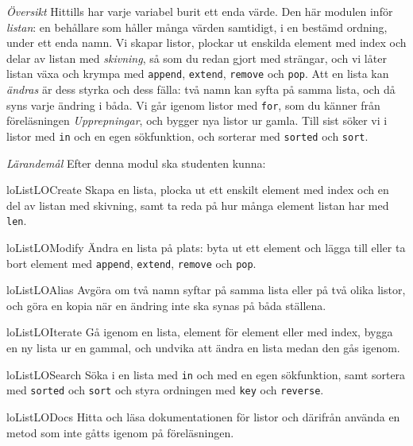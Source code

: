 \emph{Översikt}
Hittills har varje variabel burit ett enda värde.  Den här modulen inför
\emph{listan}: en behållare som håller många värden samtidigt, i en
bestämd ordning, under ett enda namn.  Vi skapar listor, plockar ut
enskilda element med index och delar av listan med \emph{skivning}, så
som du redan gjort med strängar, och vi låter listan växa och krympa
med \texttt{append}, \texttt{extend},
\texttt{remove} och \texttt{pop}.  Att en lista
kan \emph{ändras} är dess styrka och dess fälla: två namn kan syfta på
samma lista, och då syns varje ändring i båda.  Vi går igenom listor med
\texttt{for}, som du känner från föreläsningen
\emph{Upprepningar}, och
bygger nya listor ur gamla.  Till sist söker vi i listor med
\texttt{in} och en egen sökfunktion, och sorterar med
\texttt{sorted} och \texttt{sort}.

\emph{Lärandemål}
Efter denna modul ska studenten kunna:
\begin{restatable}{lo}{ListLOCreate}\label{ListLOCreate}%
  Skapa en lista, plocka ut ett enskilt element med index och en del av
  listan med skivning, samt ta reda på hur många element listan har med
  \texttt{len}.
\end{restatable}%
\begin{restatable}{lo}{ListLOModify}\label{ListLOModify}%
  Ändra en lista på plats: byta ut ett element och lägga till eller ta
  bort element med \texttt{append},
  \texttt{extend}, \texttt{remove} och
  \texttt{pop}.
\end{restatable}%
\begin{restatable}{lo}{ListLOAlias}\label{ListLOAlias}%
  Avgöra om två namn syftar på samma lista eller på två olika listor, och
  göra en kopia när en ändring inte ska synas på båda ställena.
\end{restatable}%
\begin{restatable}{lo}{ListLOIterate}\label{ListLOIterate}%
  Gå igenom en lista, element för element eller med index, bygga en ny
  lista ur en gammal, och undvika att ändra en lista medan den gås
  igenom.
\end{restatable}%
\begin{restatable}{lo}{ListLOSearch}\label{ListLOSearch}%
  Söka i en lista med \texttt{in} och med en egen
  sökfunktion, samt sortera med \texttt{sorted} och
  \texttt{sort} och styra ordningen med
  \texttt{key} och \texttt{reverse}.
\end{restatable}%
\begin{restatable}{lo}{ListLODocs}\label{ListLODocs}%
  Hitta och läsa dokumentationen för listor och därifrån använda en metod
  som inte gåtts igenom på föreläsningen.
\end{restatable}%

